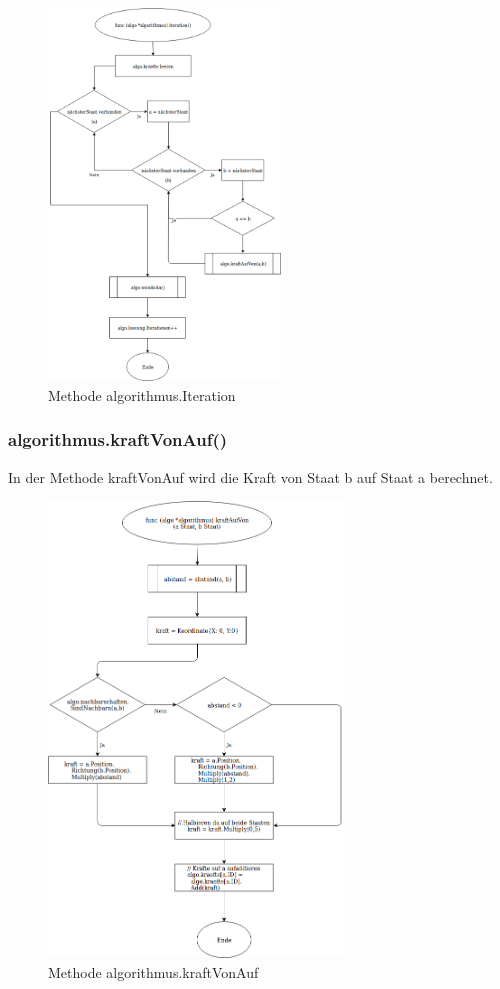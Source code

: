 \begin{figure}[h!]
    \centering
    \includegraphics[width=0.55\textwidth,]{Iteration.png}
    \caption[]{Methode algorithmus.Iteration}
\end{figure}

\pagebreak

\subsubsection{algorithmus.kraftVonAuf()}
In der Methode kraftVonAuf wird die Kraft von Staat b auf Staat a berechnet.

\begin{figure}[h!]
    \centering
    \includegraphics[width=0.7\textwidth,]{kraftVonAuf.png}
    \caption[]{Methode algorithmus.kraftVonAuf}
\end{figure}

